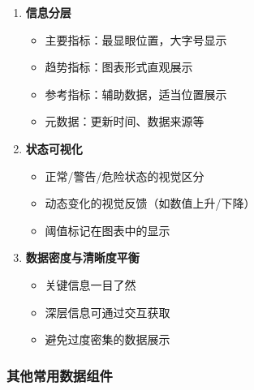 \begin{enumerate}
\def\labelenumi{\arabic{enumi}.}
\tightlist
\item
  \textbf{信息分层}

  \begin{itemize}
  \tightlist
  \item
    主要指标：最显眼位置，大字号显示
  \item
    趋势指标：图表形式直观展示
  \item
    参考指标：辅助数据，适当位置展示
  \item
    元数据：更新时间、数据来源等
  \end{itemize}
\item
  \textbf{状态可视化}

  \begin{itemize}
  \tightlist
  \item
    正常/警告/危险状态的视觉区分
  \item
    动态变化的视觉反馈（如数值上升/下降）
  \item
    阈值标记在图表中的显示
  \end{itemize}
\item
  \textbf{数据密度与清晰度平衡}

  \begin{itemize}
  \tightlist
  \item
    关键信息一目了然
  \item
    深层信息可通过交互获取
  \item
    避免过度密集的数据展示
  \end{itemize}
\end{enumerate}

\subsubsection{其他常用数据组件}\label{ux5176ux4ed6ux5e38ux7528ux6570ux636eux7ec4ux4ef6}

